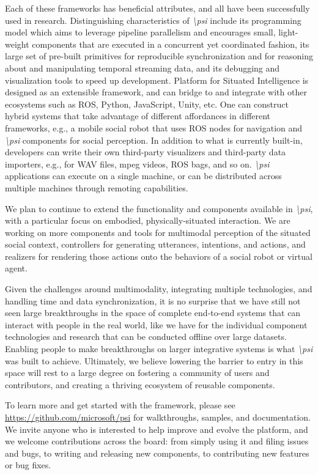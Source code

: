 \documentclass[letterpaper]{article} %
\newcommand{\psif}{\emph{\textbackslash psi} }
\newcommand{\psifnospace}{\emph{\textbackslash psi}}
\begin{document}
Each of these frameworks has beneficial attributes, and all have been successfully used in research. Distinguishing characteristics of \psif include its programming model which aims to leverage pipeline parallelism and encourages small, light-weight components that are executed in a concurrent yet coordinated fashion, its large set of pre-built primitives for reproducible synchronization and for reasoning about and manipulating temporal streaming data, and its debugging and visualization tools to speed up development.  Platform for Situated Intelligence is designed as an extensible framework, and can bridge to and integrate with other ecosystems such as ROS, Python, JavaScript, Unity, etc. One can construct hybrid systems that take advantage of different affordances in different frameworks, e.g., a mobile social robot that uses ROS nodes for navigation and \psif components for social perception. In addition to what is currently built-in, developers can write their own third-party visualizers and third-party data importers, e.g., for WAV files, mpeg videos, ROS bags, and so on. \psif applications can execute on a single machine, or can be distributed across multiple machines through remoting capabilities.


We plan to continue to extend the functionality and components available in \psifnospace, with a particular focus on embodied, physically-situated interaction. We are working on more components and tools for multimodal perception of the situated social context, controllers for generating utterances, intentions, and actions, and realizers for rendering those actions onto the behaviors of a social robot or virtual agent.

Given the challenges around multimodality, integrating multiple technologies, and handling time and data synchronization, it is no surprise that we have still not seen large breakthroughs in the space of complete end-to-end systems that can interact with people in the real world, like we have for the individual component technologies and research that can be conducted offline over large datasets. Enabling people to make breakthroughs on larger integrative systems is what \psif was built to achieve. Ultimately, we believe lowering the barrier to entry in this space will rest to a large degree on fostering a community of users and contributors, and creating a thriving ecosystem of reusable components.

To learn more and get started with the framework, please see \textcolor{blue}{\url{https://github.com/microsoft/psi}} for walkthroughs, samples, and documentation. We invite anyone who is interested to help improve and evolve the platform, and we welcome contributions across the board: from simply using it and filing issues and bugs, to writing and releasing new components, to contributing new features or bug fixes.
\end{document}
